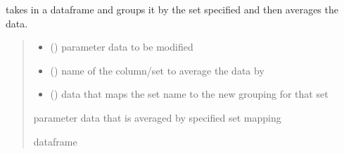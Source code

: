 \documentclass[letterpaper,10pt,english]{sphinxmanual}
\begin{document}
\begin{fulllineitems}
\label{\detokenize{src.models.electricity.scripts.preprocessor:src.models.electricity.scripts.preprocessor.avg_by_group}}
\pysigstartsignatures
\pysiglinewithargsret
{}
{\sphinxparamcomma {}\sphinxparamcomma {}}
{}
\pysigstopsignatures
\sphinxAtStartPar
takes in a dataframe and groups it by the set specified and then averages the data.
\begin{quote}\begin{description}
\begin{itemize}
\item {} 
\sphinxAtStartPar
{} () \textendash{} parameter data to be modified

\item {} 
\sphinxAtStartPar
{} () \textendash{} name of the column/set to average the data by

\item {} 
\sphinxAtStartPar
{} () \textendash{} data that maps the set name to the new grouping for that set

\end{itemize}

\sphinxAtStartPar
parameter data that is averaged by specified set mapping

\sphinxAtStartPar
dataframe

\end{description}\end{quote}

\end{fulllineitems}

\end{document}
